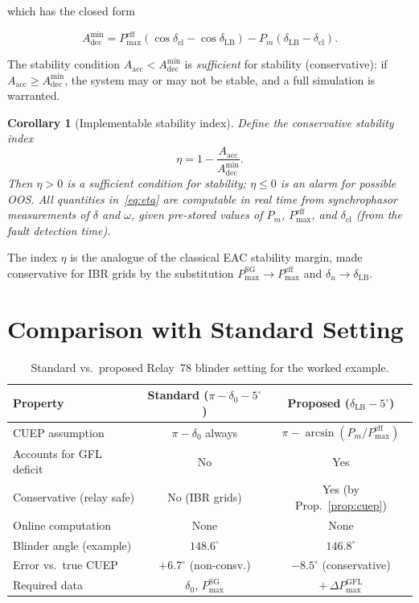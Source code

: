 \documentclass[11pt,a4paper]{article}
\newtheorem{corollary}{Corollary}
\newcommand{\dz}{\delta_0}         %
\newcommand{\du}{\delta_u}         %
\newcommand{\dlb}{\delta_{\mathrm{LB}}}   %
\newcommand{\dcl}{\delta_{\mathrm{cl}}}   %
\newcommand{\Pm}{P_m}
\newcommand{\PmaxSG}{P_{\max}^{\mathrm{SG}}}
\newcommand{\PmaxEff}{P_{\max}^{\mathrm{eff}}}
\newcommand{\Aacc}{A_{\mathrm{acc}}}
\newcommand{\Adec}{A_{\mathrm{dec}}}
\begin{document}
which has the closed form

\begin{equation}
  \Adec^{\min} = \PmaxEff(\cos\dcl - \cos\dlb) - \Pm(\dlb - \dcl).
  \label{eq:Adec_min_closed}
\end{equation}

The stability condition $\Aacc < \Adec^{\min}$ is \emph{sufficient} for
stability (conservative): if $\Aacc \geq \Adec^{\min}$, the system may
or may not be stable, and a full simulation is warranted.

\begin{corollary}[Implementable stability index]
\label{cor:index}
Define the \emph{conservative stability index}
\begin{equation}
  \eta = 1 - \frac{\Aacc}{\Adec^{\min}}.
  \label{eq:eta}
\end{equation}
Then $\eta > 0$ is a \emph{sufficient} condition for stability; $\eta \leq 0$
is an alarm for possible OOS.  All quantities in~\eqref{eq:eta} are
computable in real time from synchrophasor measurements of $\delta$ and
$\omega$, given pre-stored values of $\Pm$, $\PmaxEff$, and $\dcl$ (from the
fault detection time).
\end{corollary}

The index $\eta$ is the analogue of the classical EAC stability margin, made
conservative for IBR grids by the substitution $\PmaxSG \to \PmaxEff$ and
$\du \to \dlb$.

\section{Comparison with Standard Setting}
\label{sec:comparison}

\begin{table}[ht]
  \centering
  \caption{Standard vs.\ proposed Relay~78 blinder setting for the worked example.}
  \label{tab:compare}
  \begin{tabular}{lcc}
    \toprule
    Property & Standard ($\pi - \dz - 5^\circ$) & Proposed ($\dlb - 5^\circ$) \\
    \midrule
    CUEP assumption          & $\pi - \dz$ always         & $\pi - \arcsin(\Pm/\PmaxEff)$ \\
    Accounts for GFL deficit & No                          & Yes \\
    Conservative (relay safe)& No (IBR grids)              & Yes (by Prop.~\ref{prop:cuep}) \\
    Online computation       & None                        & None \\
    Blinder angle (example)  & $148.6^\circ$               & $146.8^\circ$ \\
    Error vs.\ true CUEP     & $+6.7^\circ$ (non-consv.)   & $-8.5^\circ$ (conservative) \\
    Required data            & $\dz$, $\PmaxSG$            & $+\,\Delta P_{\max}^{\mathrm{GFL}}$ \\
    \bottomrule
  \end{tabular}
\end{table}
\end{document}
